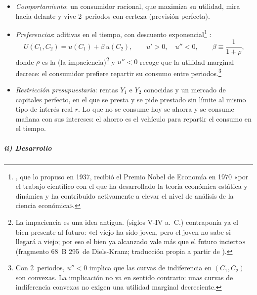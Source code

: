 \documentclass[11pt]{article}
\begin{document}
\begin{itemize}
\item \emph{Comportamiento}: un consumidor racional, que maximiza su utilidad, mira hacia delante y vive 2~periodos con certeza (previsión perfecta).
\item \emph{Preferencias}: aditivas en el tiempo, con descuento exponencial\nocite{Samuelson1937Note}\footnote{, que lo propuso en 1937, recibió el Premio Nobel de Economía en 1970 «por el trabajo científico con el que ha desarrollado la teoría económica estática y dinámica y ha contribuido activamente a elevar el nivel de análisis de la ciencia económica»\nocite{Nobel1970Samuelson}.} :
  \begin{equation*}
  U(C_1,C_2)=u(C_1)+\beta\,u(C_2),\qquad u'>0,\quad u''<0,\qquad \beta\equiv\frac{1}{1+\rho},
  \end{equation*}
  donde $\rho$ es la  (la impaciencia)\footnote{La impaciencia es una idea antigua.  (siglos V-IV a.~C.) contraponía ya el bien presente al futuro: «el viejo ha sido joven, pero el joven no sabe si llegará a viejo; por eso el bien ya alcanzado vale más que el futuro incierto» (fragmento 68~B 295~de Diels-Kranz; traducción propia a partir de \textcite{Freeman1948Ancilla}).} y $u''<0$ recoge que la utilidad marginal decrece: el consumidor prefiere repartir su consumo entre periodos.\footnote{Con 2~periodos, $u''<0$ implica que las curvas de indiferencia en $(C_1,C_2)$ son convexas. La implicación no va en sentido contrario: unas curvas de indiferencia convexas no exigen una utilidad marginal decreciente.}
\item \emph{Restricción presupuestaria}: rentas $Y_1$ e $Y_2$ conocidas y un mercado de capitales perfecto, en el que se presta y se pide prestado sin límite al mismo tipo de interés real $r$. Lo que no se consume hoy se ahorra y se consume mañana con sus intereses: el ahorro es el vehículo para repartir el consumo en el tiempo.
\end{itemize}

\subparagraph{ii) Desarrollo}
\end{document}
